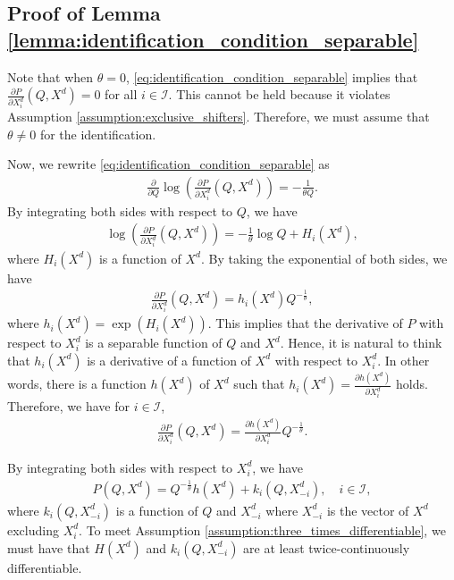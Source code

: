 \documentclass[11pt, a4paper]{article}
\theoremstyle{remark}
\begin{document}
\subsection{Proof of Lemma \ref{lemma:identification_condition_separable}}

Note that when $\theta = 0$, \eqref{eq:identification_condition_separable} implies that $\frac{\partial P}{\partial X^{d}_i}(Q, X^{d}) = 0$ for all $i \in \mathcal{I}$.
This cannot be held because it violates Assumption \ref{assumption:exclusive_shifters}.
Therefore, we must assume that $\theta \ne 0$ for the identification.



Now, we rewrite \eqref{eq:identification_condition_separable} as
\begin{align}
    \frac{\partial }{\partial Q}\log \left(\frac{\partial P}{\partial X^{d}_i}(Q, X^{d})\right) = -\frac{1}{\theta Q}.
\end{align}
By integrating both sides with respect to $Q$, we have
\begin{align}
    \log \left(\frac{\partial P}{\partial X^{d}_i}(Q, X^{d})\right) = -\frac{1}{\theta}\log Q + H_i(X^{d}),
\end{align}
where $H_i(X^{d})$ is a function of $X^{d}$.
By taking the exponential of both sides, we have
\begin{align}
    \frac{\partial P}{\partial X^{d}_i}(Q, X^{d}) = h_i(X^{d})Q^{-\frac{1}{\theta}},
\end{align}
where $h_i(X^{d})  = \exp(H_i(X^{d}))$.
This implies that the derivative of $P$ with respect to $X^{d}_i$ is a separable function of $Q$ and $X^{d}$.
Hence, it is natural to think that $h_i(X^{d})$ is a derivative of a function of $X^{d}$ with respect to $X^{d}_i$.
In other words, there is a function $h(X^{d})$ of $X^{d}$ such that $h_i(X^{d}) = \frac{\partial h(X^{d})}{\partial X^{d}_i}$ holds.
Therefore, we have for $i \in \mathcal{I}$,
\begin{align}
    \frac{\partial P}{\partial X^{d}_i}(Q, X^{d}) = \frac{\partial h(X^{d})}{\partial X^{d}_i} Q^{-\frac{1}{\theta}}.
\end{align}


By integrating both sides with respect to $X^{d}_i$, we have
\begin{align}
    P(Q, X^{d}) = Q^{-\frac{1}{\theta}}h(X^{d}) + k_i(Q, X^{d}_{-i}), \quad i \in \mathcal{I}, \label{eq:identification_separable_demand_i}
\end{align}
where $k_i(Q, X^{d}_{-i})$ is a function of $Q$ and $X^{d}_{-i}$ where $X^{d}_{-i}$ is the vector of $X^{d}$ excluding $X^{d}_i$.
To meet Assumption \ref{assumption:three_times_differentiable}, we must have that $H(X^{d})$ and $k_i(Q, X^{d}_{-i})$ are at least twice-continuously differentiable.
\end{document}
